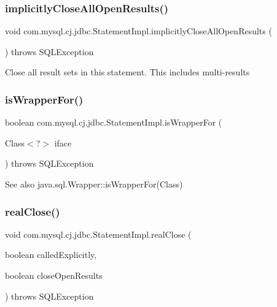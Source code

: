 \subsubsection{\texorpdfstring{implicitly\+Close\+All\+Open\+Results()}{implicitlyCloseAllOpenResults()}}
{\footnotesize\ttfamily void com.\+mysql.\+cj.\+jdbc.\+Statement\+Impl.\+implicitly\+Close\+All\+Open\+Results (\begin{DoxyParamCaption}{ }\end{DoxyParamCaption}) throws S\+Q\+L\+Exception\hspace{0.3cm}{\ttfamily [protected]}}

Close all result sets in this statement. This includes multi-\/results \mbox{\label{classcom_1_1mysql_1_1cj_1_1jdbc_1_1_statement_impl_a403bf25ba81ab01a60bdb9f2d4b4cfed}} 
\subsubsection{\texorpdfstring{is\+Wrapper\+For()}{isWrapperFor()}}
{\footnotesize\ttfamily boolean com.\+mysql.\+cj.\+jdbc.\+Statement\+Impl.\+is\+Wrapper\+For (\begin{DoxyParamCaption}\item[{Class$<$?$>$}]{iface }\end{DoxyParamCaption}) throws S\+Q\+L\+Exception}

\begin{DoxySeeAlso}{See also}
java.\+sql.\+Wrapper\+::is\+Wrapper\+For(\+Class) 
\end{DoxySeeAlso}
\mbox{\label{classcom_1_1mysql_1_1cj_1_1jdbc_1_1_statement_impl_aea1b46dca9271ff10f7e65ba92c224fa}} 
\subsubsection{\texorpdfstring{real\+Close()}{realClose()}}
{\footnotesize\ttfamily void com.\+mysql.\+cj.\+jdbc.\+Statement\+Impl.\+real\+Close (\begin{DoxyParamCaption}\item[{boolean}]{called\+Explicitly,  }\item[{boolean}]{close\+Open\+Results }\end{DoxyParamCaption}) throws S\+Q\+L\+Exception\hspace{0.3cm}{\ttfamily [protected]}}


